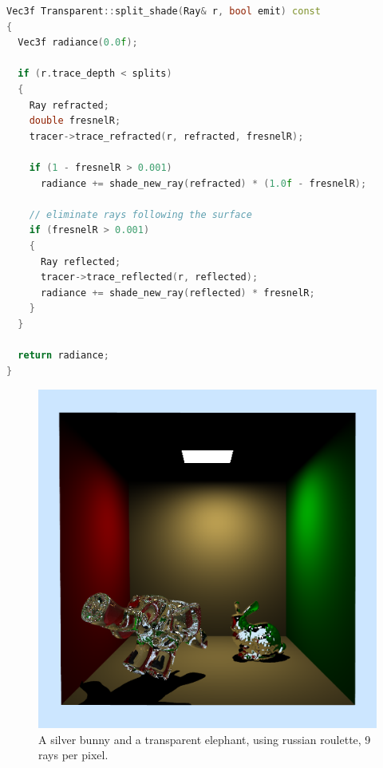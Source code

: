 \newpage
\begin{lstlisting}[language=C++,caption=Transparent::split\_shade,label=lst:transparent::split_shade,firstnumber=67]
Vec3f Transparent::split_shade(Ray& r, bool emit) const
{
  Vec3f radiance(0.0f);

  if (r.trace_depth < splits)
  {
    Ray refracted;
    double fresnelR;
    tracer->trace_refracted(r, refracted, fresnelR);

    if (1 - fresnelR > 0.001)
      radiance += shade_new_ray(refracted) * (1.0f - fresnelR);

    // eliminate rays following the surface
    if (fresnelR > 0.001)
    {
      Ray reflected;
      tracer->trace_reflected(r, reflected);
      radiance += shade_new_ray(reflected) * fresnelR;
    }
  }

  return radiance;
}
\end{lstlisting}

\begin{figure}[h]
	\centering
	
	\includegraphics[width=\textwidth]{week3/bunny_el_9rpp.png}
	
	\caption{A silver bunny and a transparent elephant, using russian roulette, 9 rays per pixel.}
	\label{fig:bunnyelephant.png}
\end{figure}